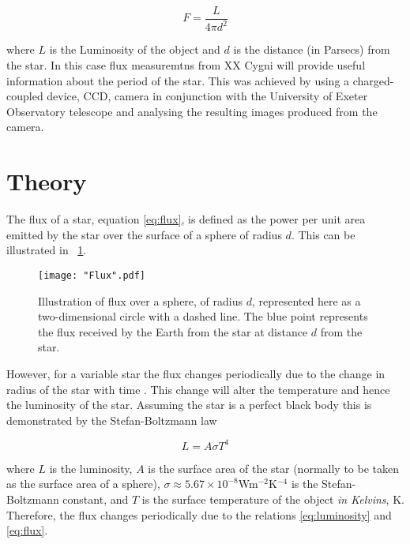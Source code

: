 \documentclass{article}
\newcommand{\figref}[2][\figurename~]{#1\ref{#2}}
\begin{document}
\begin{equation}
\label{eq:flux}
F = \frac{L}{4\pi d^2} 
\end{equation}

\vspace{2mm}
\noindent
where $L$ is the Luminosity of the object and $d$ is the distance (in Parsecs) from the star. In this case flux measuremtns from XX Cygni will provide useful information about the period of the star. This was achieved by using a charged-coupled device, CCD, camera in conjunction with the University of Exeter Observatory telescope \cite{Paper01} and analysing the resulting images produced from the camera. 


\section{Theory}
\label{sec:theory}

The flux of a star, equation \eqref{eq:flux}, is defined as the power per unit area emitted by the star over the surface of a sphere of radius $d$. This can be illustrated in \figref{fig:flux-sphere}.

\vspace{2mm}

\begin{figure}[h]
\centering
\texttt{[image: "Flux".pdf]}
\caption{Illustration of flux over a sphere, of radius $d$, represented here as a two-dimensional circle with a dashed line. The blue point represents the flux received by the Earth from the star at distance $d$ from the star.}
\label{fig:flux-sphere}
\end{figure}


\vspace{2mm}
\noindent
However, for a variable star the flux changes periodically due to the change in radius of the star with time \cite{Paper02}. This change will alter the temperature and hence the luminosity of the star. Assuming the star is a perfect black body this is demonstrated by the Stefan-Boltzmann law

\begin{equation}
\label{eq:luminosity}
L = A\sigma T^4
\end{equation}

\vspace{2mm}
\noindent
where $L$ is the luminosity, $A$ is the surface area of the star (normally to be taken as the surface area of a sphere), $\sigma \approx 5.67 \times 10^{-8}$Wm$^{-2}$K$^{-4}$ is the Stefan-Boltzmann constant, and $T$ is the surface temperature of the object \textit{in Kelvins}, K. Therefore, the flux changes periodically due to the relations \eqref{eq:luminosity} and \eqref{eq:flux}. 
\end{document}
